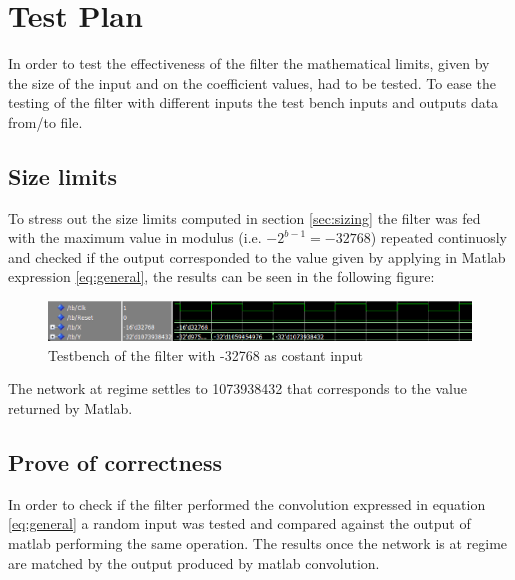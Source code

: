 \section{Test Plan}
In order to test the effectiveness of the filter the mathematical limits, given by the size of the input and on the coefficient values, had to be tested.
To ease the testing of the filter with different inputs the test bench inputs and outputs data from/to file.
\subsection{Size limits}
To stress out the size limits computed in section \ref{sec:sizing} the filter was fed with the maximum value in modulus (i.e. $-2^{b-1}= -32768 $) repeated continuosly and checked if the output corresponded to the value given by applying in Matlab expression \ref{eq:general}, the results can be seen in the following figure:
\begin{figure}[H]
  \centering
  \includegraphics[width=0.9\linewidth]{./images/simul32768.PNG}
  \caption{Testbench of the filter with -32768 as costant input}
  \label{fig:32768}
\end{figure}
The network at regime settles to 1073938432 that corresponds to the value returned by Matlab.
\subsection{Prove of correctness}
In order to check if the filter performed the convolution expressed in equation \ref{eq:general} a random input was tested and compared against the output of matlab performing the same operation. The results once the network is at regime are matched by the output produced by matlab convolution.
